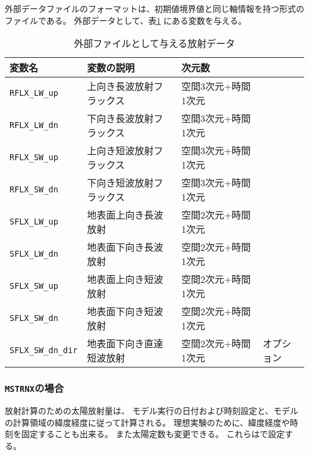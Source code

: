 \noindent
外部データファイルのフォーマットは、初期値境界値と同じ軸情報を持つ{\netcdf}形式のファイルである。
外部データとして、表\ref{tab:var_list_atm_rd_offline} にある変数を与える。
\begin{table}[h]
\begin{center}
  \caption{外部ファイルとして与える放射データ}
  \label{tab:var_list_atm_rd_offline}
  \begin{tabularx}{150mm}{lXll} \hline
    \rowcolor[gray]{0.9}  変数名 & 変数の説明 & 次元数 & \\ \hline
      \verb|RFLX_LW_up|     & 上向き長波放射フラックス & 空間3次元+時間1次元 \\
      \verb|RFLX_LW_dn|     & 下向き長波放射フラックス & 空間3次元+時間1次元 \\
      \verb|RFLX_SW_up|     & 上向き短波放射フラックス & 空間3次元+時間1次元 \\
      \verb|RFLX_SW_dn|     & 下向き短波放射フラックス & 空間3次元+時間1次元 \\
      \verb|SFLX_LW_up|     & 地表面上向き長波放射    & 空間2次元+時間1次元 \\
      \verb|SFLX_LW_dn|     & 地表面下向き長波放射    & 空間2次元+時間1次元 \\
      \verb|SFLX_SW_up|     & 地表面上向き短波放射    & 空間2次元+時間1次元 \\
      \verb|SFLX_SW_dn|     & 地表面下向き短波放射    & 空間2次元+時間1次元 \\
      \verb|SFLX_SW_dn_dir| & 地表面下向き直達短波放射 & 空間2次元+時間1次元 & オプション \\
    \hline
  \end{tabularx}
\end{center}
\end{table}


\subsubsection{\texttt{MSTRNX}の場合}

放射計算のための太陽放射量は、
モデル実行の日付および時刻設定と、モデルの計算領域の緯度経度に従って計算される。
理想実験のために、緯度経度や時刻を固定することも出来る。
また太陽定数も変更できる。
これらはで設定する。\\

